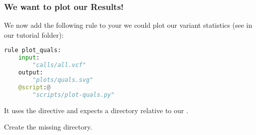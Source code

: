 \begin{frame}[fragile]
  \frametitle{We want to plot our Results!}
  We now add the following rule to your  we could plot our variant statistics (see  in our tutorial folder):
  \begin{lstlisting}[language=Python,style=Python]
rule plot_quals:
    input:
        "calls/all.vcf"
    output:
        "plots/quals.svg"
    @script:@
        "scripts/plot-quals.py"
  \end{lstlisting}
  It uses the  directive and expects a directory  relative to our .
  \pause
  \begin{task}
  	Create the missing directory.
  \end{task}
\end{frame}

